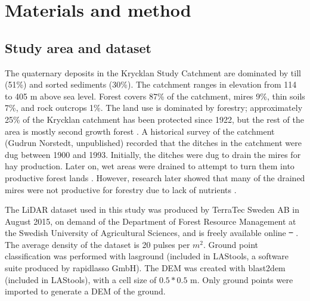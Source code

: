 \documentclass[11pt, review]{elsarticle} %
\providecommand{\DIFaddtex}[1]{{\protect\color{blue}\uwave{#1}}} %
\providecommand{\DIFdeltex}[1]{{\protect\color{red}\sout{#1}}}                      %
\providecommand{\DIFaddbegin}{} %
\providecommand{\DIFaddend}{} %
\providecommand{\DIFdelbegin}{} %
\providecommand{\DIFdelend}{} %
\providecommand{\DIFadd}[1]{\texorpdfstring{\DIFaddtex{#1}}{#1}} %
\providecommand{\DIFdel}[1]{\texorpdfstring{\DIFdeltex{#1}}{}} %
\begin{document}
\section{Materials and method}
\label{method}

\subsection{Study area and dataset}
The quaternary deposits in the Krycklan Study Catchment are dominated by till (51\%) and sorted sediments (30\%). The catchment ranges in elevation from 114 to 405 m above sea level. Forest covers 87\% of the catchment, mires 9\%, thin soils 7\%, and rock outcrops 1\%. The land use is dominated by forestry; approximately 25\% of the Krycklan catchment has been protected since 1922, but  the rest of the area is mostly second growth forest \citep{krycklancatchment}.  A historical survey of the catchment (Gudrun Norstedt, unpublished) recorded  that the ditches in the catchment were dug between 1900 and 1993. Initially, the ditches were dug to drain the mires for hay production. Later on, wet areas were drained to attempt to turn them into productive forest lands \citep{paivanen}. However, research later showed that many of the drained mires were not productive for forestry due to lack of nutrients \citep{sikstrom}.

The LiDAR dataset used in this study was produced by TerraTec Sweden AB in August 2015, on demand of the Department of Forest Resource Management at the Swedish University of Agricultural Sciences, and is freely available online \DIFdelbegin \DIFdel{\mbox{%
\citep{dataset}}\hspace{0pt}%
}\DIFdelend \DIFaddbegin \DIFadd{\mbox{%
\citep{dataset_raw}}\hspace{0pt}%
}\DIFaddend . The average density of the dataset is 20 pulses per $m^2$. Ground point classification was performed with lasground (included in LAStools, a software suite produced by rapidlasso GmbH). The DEM was created with blast2dem (included in LAStools), with a cell size of $0.5*0.5$ m. Only ground points were imported to generate a DEM of the ground.
\end{document}

